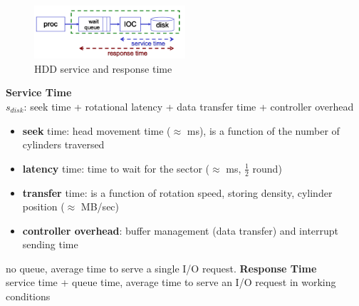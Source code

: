 \documentclass[10pt, oneside]{article}
\begin{document}
\begin{figure}[H]
    \begin{center}
    \includegraphics[width=0.5\textwidth]{img/img13.png}
    \caption{HDD service and response time}
    \label{fig:HDD time}
    \end{center}
\end{figure}
{\bf Service Time}\\
$s_{disk}$: seek time + rotational latency + data transfer time + controller overhead
\begin{itemize}
    \item {\bf seek} time: head movement time ($\approx$ ms), is a function of the number of cylinders traversed
    \item {\bf latency} time: time to wait for the sector ($\approx$ ms, $\frac{1}{2}$ round)
    \item {\bf transfer} time: is a function of rotation speed, storing density, cylinder position ($\approx$ MB/sec)
    \item {\bf controller overhead}: buffer management (data transfer) and interrupt sending time
\end{itemize}
no queue, average time to serve a single I/O request.
\newline
{\bf Response Time}\\
service time + queue time, average time to serve an I/O request in working conditions
\newline
\end{document}

